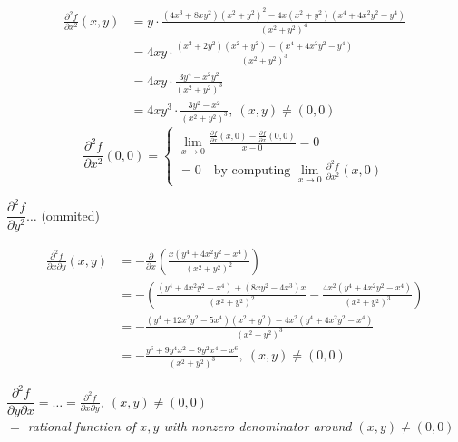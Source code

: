 \begin{example}
\begin{enumerate}[label=\emph{(\arabic*)}]
              \begin{align*}
                  \frac{\partial^2f}{\partial x^2}(x,y) & =y\cdot\frac{(4x^3+8xy^2)(x^2+y^2)^2-4x(x^2+y^2)(x^4+4x^2y^2-y^4)}{(x^2+y^2)^4} \\
                                                        & =4xy\cdot\frac{(x^2+2y^2)(x^2+y^2)-(x^4+4x^2y^2-y^4)}{(x^2+y^2)^3}              \\
                                                        & =4xy\cdot\frac{3y^4-x^2y^2}{(x^2+y^2)^3}                                        \\
                                                        & =4xy^3\cdot\frac{3y^2-x^2}{(x^2+y^2)^3},\ (x,y)\neq(0,0)
              \end{align*}
              $$
                  \frac{\partial^2f}{\partial x^2}(0,0)=\begin{cases}
                      \lim_{x\to0}\frac{\frac{\partial f}{\partial x}(x,0)-\frac{\partial f}{\partial x}(0,0)}{x-0}=0 \\
                      =0\quad\text{by computing }\lim_{x\to0}\frac{\partial^2f}{\partial x^2}(x,0)
                  \end{cases}
              $$

              $\dfrac{\partial^2f}{\partial y^2}\dots$ (ommited)

              \begin{align*}
                  \frac{\partial^2f}{\partial x\partial y}(x,y) & =-\frac{\partial}{\partial x}\left(\frac{x(y^4+4x^2y^2-x^4)}{(x^2+y^2)^2}\right)                             \\
                                                                & =-\left(\frac{(y^4+4x^2y^2-x^4)+(8xy^2-4x^3)x}{(x^2+y^2)^2}-\frac{4x^2(y^4+4x^2y^2-x^4)}{(x^2+y^2)^3}\right) \\
                                                                & =-\frac{(y^4+12x^2y^2-5x^4)(x^2+y^2)-4x^2(y^4+4x^2y^2-x^4)}{(x^2+y^2)^3}                                     \\
                                                                & =-\frac{y^6+9y^4x^2-9y^2x^4-x^6}{(x^2+y^2)^3},\ (x,y)\neq(0,0)
              \end{align*}

              $\dfrac{\partial^2f}{\partial y\partial x}=\dots=\frac{\partial^2f}{\partial x\partial y},\ (x,y)\neq(0,0)$\\
              \emph{$=$ rational function of $x,y$ with nonzero denominator around $(x,y)\neq(0,0)$}


\end{enumerate}
\end{example}
